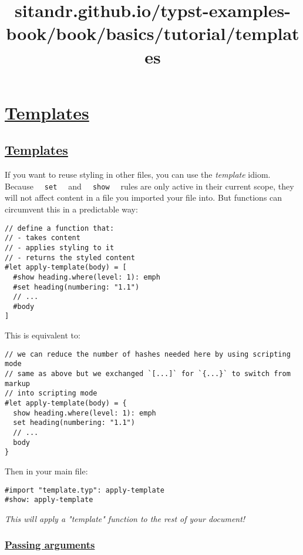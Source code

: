 \title{sitandr.github.io/typst-examples-book/book/basics/tutorial/templates}

\section{\texorpdfstring{\hyperref[templates]{Templates}}{Templates}}\label{templates}

\subsection{\texorpdfstring{\hyperref[templates-1]{Templates}}{Templates}}\label{templates-1}

If you want to reuse styling in other files, you can use the
\emph{template} idiom. Because \texttt{\ }{\texttt{\ set\ }}\texttt{\ }
and \texttt{\ }{\texttt{\ show\ }}\texttt{\ } rules are only active in
their current scope, they will not affect content in a file you imported
your file into. But functions can circumvent this in a predictable way:

\begin{verbatim}
// define a function that:
// - takes content
// - applies styling to it
// - returns the styled content
#let apply-template(body) = [
  #show heading.where(level: 1): emph
  #set heading(numbering: "1.1")
  // ...
  #body
]
\end{verbatim}

This is equivalent to:

\begin{verbatim}
// we can reduce the number of hashes needed here by using scripting mode
// same as above but we exchanged `[...]` for `{...}` to switch from markup
// into scripting mode
#let apply-template(body) = {
  show heading.where(level: 1): emph
  set heading(numbering: "1.1")
  // ...
  body
}
\end{verbatim}

Then in your main file:

\begin{verbatim}
#import "template.typ": apply-template
#show: apply-template
\end{verbatim}

\emph{This will apply a "template" function to the rest of your
document!}

\subsubsection{\texorpdfstring{\hyperref[passing-arguments]{Passing
arguments}}{Passing arguments}}\label{passing-arguments}

